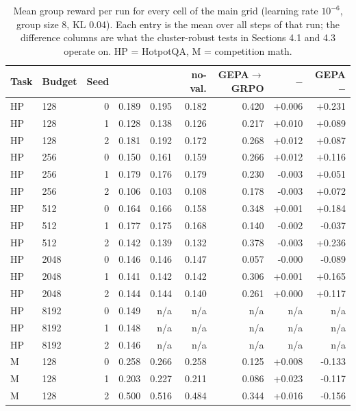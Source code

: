 \begin{table}[!htbp]
  \caption{Mean group reward per run for every cell of the main grid (learning rate $10^{-6}$, group size 8, KL 0.04). Each entry is the mean over all steps of that run; the difference columns are what the cluster-robust tests in Sections 4.1 and 4.3 operate on. HP = HotpotQA, M = competition math.}
  \label{tab:percell}
  \centering
  \scriptsize
  \setlength{\tabcolsep}{4pt}
  \begin{tabular}{@{}llr rrrr rr@{}}
    \toprule
    Task & Budget & Seed & \drgrpo{} & \rca{} & \rca{} no-val. & GEPA$\rightarrow$GRPO & \rca{}$-$\drgrpo{} & GEPA$-$\drgrpo{} \\
    \midrule
    HP & 128 & 0 & 0.189 & 0.195 & 0.182 & 0.420 & +0.006 & +0.231 \\
    HP & 128 & 1 & 0.128 & 0.138 & 0.126 & 0.217 & +0.010 & +0.089 \\
    HP & 128 & 2 & 0.181 & 0.192 & 0.172 & 0.268 & +0.012 & +0.087 \\
    HP & 256 & 0 & 0.150 & 0.161 & 0.159 & 0.266 & +0.012 & +0.116 \\
    HP & 256 & 1 & 0.179 & 0.176 & 0.179 & 0.230 & -0.003 & +0.051 \\
    HP & 256 & 2 & 0.106 & 0.103 & 0.108 & 0.178 & -0.003 & +0.072 \\
    HP & 512 & 0 & 0.164 & 0.166 & 0.158 & 0.348 & +0.001 & +0.184 \\
    HP & 512 & 1 & 0.177 & 0.175 & 0.168 & 0.140 & -0.002 & -0.037 \\
    HP & 512 & 2 & 0.142 & 0.139 & 0.132 & 0.378 & -0.003 & +0.236 \\
    HP & 2048 & 0 & 0.146 & 0.146 & 0.147 & 0.057 & -0.000 & -0.089 \\
    HP & 2048 & 1 & 0.141 & 0.142 & 0.142 & 0.306 & +0.001 & +0.165 \\
    HP & 2048 & 2 & 0.144 & 0.144 & 0.140 & 0.261 & +0.000 & +0.117 \\
    HP & 8192 & 0 & 0.149 & n/a & n/a & n/a & n/a & n/a \\
    HP & 8192 & 1 & 0.148 & n/a & n/a & n/a & n/a & n/a \\
    HP & 8192 & 2 & 0.146 & n/a & n/a & n/a & n/a & n/a \\
    \midrule
    M & 128 & 0 & 0.258 & 0.266 & 0.258 & 0.125 & +0.008 & -0.133 \\
    M & 128 & 1 & 0.203 & 0.227 & 0.211 & 0.086 & +0.023 & -0.117 \\
    M & 128 & 2 & 0.500 & 0.516 & 0.484 & 0.344 & +0.016 & -0.156 \\

\end{tabular}
\end{table}
